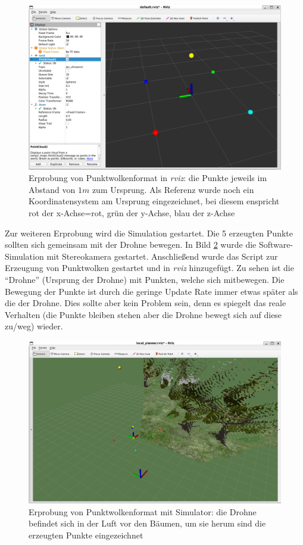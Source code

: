 \begin{figure}[!h]
    \centering
    \includegraphics[width=0.7\linewidth]{images/ultra_pc_test.png}
    \caption[Erprobung von Punktwolkenformat]{Erprobung von Punktwolkenformat in \textit{rviz}: die Punkte jeweils im Abstand von $1m$ zum Ursprung. Als Referenz wurde noch ein Koordinatensystem am Ursprung eingezeichnet, bei diesem enspricht rot der x-Achse=rot, grün der y-Achse, blau der z-Achse}
    \label{fig:ultra_pc_test}
\end{figure}

Zur weiteren Erprobung wird die Simulation gestartet. Die 5 erzeugten Punkte sollten sich gemeinsam mit der Drohne bewegen. In Bild \ref{fig:ultra_pc_test_sim} wurde die Software-Simulation mit Stereokamera gestartet. Anschließend wurde das Script zur Erzeugung von Punktwolken gestartet und in \textit{rviz} hinzugefügt. Zu sehen ist die \enquote{Drohne} (Ursprung der Drohne) mit Punkten, welche sich mitbewegen. Die Bewegung der Punkte ist durch die geringe Update Rate immer etwas später als die der Drohne. Dies sollte aber kein Problem sein, denn es spiegelt das reale Verhalten (die Punkte bleiben stehen aber die Drohne bewegt sich auf diese zu/weg) wieder.

\begin{figure}[!h]
    \centering
    \includegraphics[width=0.7\linewidth]{images/ultra_pc_test_sim.png}
    \caption[Erprobung von Punktwolkenformat mit Simulator]{Erprobung von Punktwolkenformat mit Simulator: die Drohne befindet sich in der Luft vor den Bäumen, um sie herum sind die erzeugten Punkte eingezeichnet}
    \label{fig:ultra_pc_test_sim}
\end{figure}

